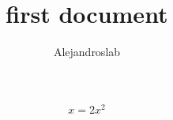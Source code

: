 \documentclass[12pt, oneside]{article}
\title{first document}
\author{Alejandroslab}
\begin{document}
\maketitle

\begin{equation}
x=2x^2
\end{equation}
\end{document}
